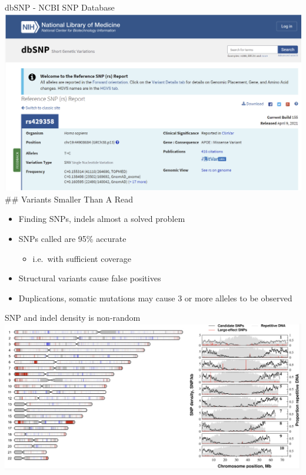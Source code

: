 \documentclass[
  ignorenonframetext,
]{beamer}
\providecommand{\tightlist}{%
  \setlength{\itemsep}{0pt}\setlength{\parskip}{0pt}}
\begin{document}
\begin{frame}{dbSNP - NCBI SNP Database}
\label{dbsnp---ncbi-snp-database}
\includegraphics{figs/dbsnp.png} \#\# Variants Smaller Than A Read

\Large

\begin{itemize}
\tightlist
\item
  Finding SNPs, indels almost a solved problem
\item
  SNPs called are 95\% accurate

  \begin{itemize}
  \tightlist
  \item
    i.e.~with sufficient coverage
  \end{itemize}
\item
  Structural variants cause false positives
\item
  Duplications, somatic mutations may cause 3 or more alleles to be
  observed
\end{itemize}
\end{frame}

\begin{frame}{SNP and indel density is non-random}
\label{snp-and-indel-density-is-non-random}
\includegraphics{figs/snp_density.png}
\end{frame}
\end{document}
